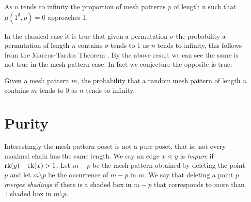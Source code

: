 \documentclass[11pt,a4paper,oneside]{article}
\begin{document}
\begin{cor}
As $n$ tends to infinity the proportion of mesh patterns $p$ of length n such that $\mu(1^\emptyset,p)=0$ approaches $1$.
\end{cor}


In the classical case it is true that given a permutation $\sigma$ the probability a permutation of length $n$ contains $\sigma$ tends to $1$ as $n$ tends to infinity, this follows from the Marcus-Tardos Theorem \cite{MT04}. By the above result we can see the same is not true in the mesh pattern case. In fact we conjecture the opposite is true:
\begin{conj}
Given a mesh pattern $m$, the probability that a random mesh pattern of length $n$ contains $m$ tends to $0$ as $n$ tends to infinity.
\end{conj}




\section{Purity}

Interestingly the mesh pattern poset is not a pure poset, that is, not every maximal chain has the same length. We say an edge $x\lessdot y$ is \emph{impure} if $\operatorname{\textrm{rk}}(y)-\operatorname{\textrm{rk}}(x)>1$. Let $m-p$ be the mesh pattern obtained by deleting the point $p$ and let $m\setminus p$ be the occurrence of $m-p$ in $m$. We say that deleting a point $p$ \emph{merges shadings} if there is a shaded box in $m-p$ that corresponds to more than $1$ shaded box in $m\setminus p$.
\end{document}
